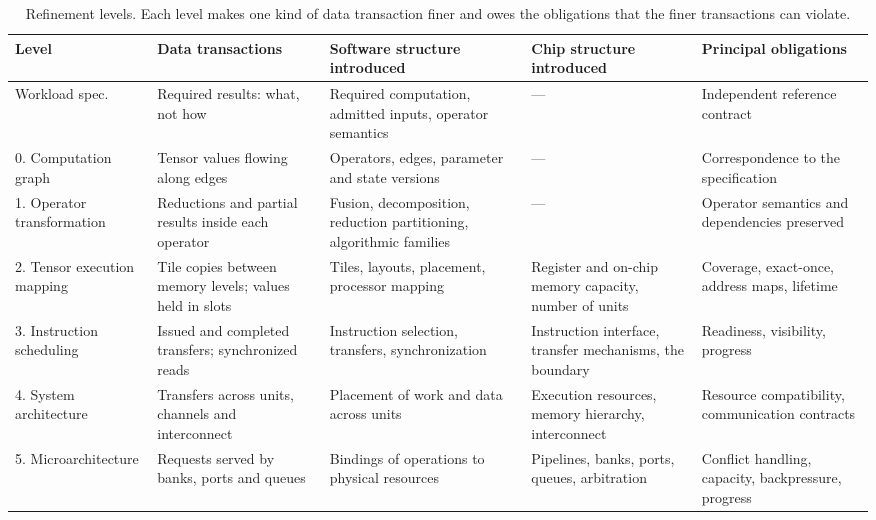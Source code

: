 \documentclass[11pt]{article}
\begin{document}
\begin{table}[tb]
\small
\begin{tabular}{@{}L{0.14\textwidth}L{0.19\textwidth}L{0.19\textwidth}L{0.17\textwidth}L{0.18\textwidth}@{}}
\toprule
Level & Data transactions & Software structure introduced & Chip structure introduced & Principal obligations \\
\midrule
Workload spec. & Required results: what, not how & Required computation, admitted inputs, operator semantics & --- & Independent reference contract \\
0. Computation graph & Tensor values flowing along edges & Operators, edges, parameter and state versions & --- & Correspondence to the specification \\
1. Operator transformation & Reductions and partial results inside each operator & Fusion, decomposition, reduction partitioning, algorithmic families & --- & Operator semantics and dependencies preserved \\
2. Tensor execution mapping & Tile copies between memory levels; values held in slots & Tiles, layouts, placement, processor mapping & Register and on-chip memory capacity, number of units & Coverage, exact-once, address maps, lifetime \\
3. Instruction scheduling & Issued and completed transfers; synchronized reads & Instruction selection, transfers, synchronization & Instruction interface, transfer mechanisms, the boundary & Readiness, visibility, progress \\
4. System architecture & Transfers across units, channels and interconnect & Placement of work and data across units & Execution resources, memory hierarchy, interconnect & Resource compatibility, communication contracts \\
5. Microarchitecture & Requests served by banks, ports and queues & Bindings of operations to physical resources & Pipelines, banks, ports, queues, arbitration & Conflict handling, capacity, backpressure, progress \\
\bottomrule
\end{tabular}
\caption{Refinement levels. Each level makes one kind of data transaction finer and owes the obligations that the finer transactions can violate.}
\label{tab:levels}
\end{table}
\end{document}
